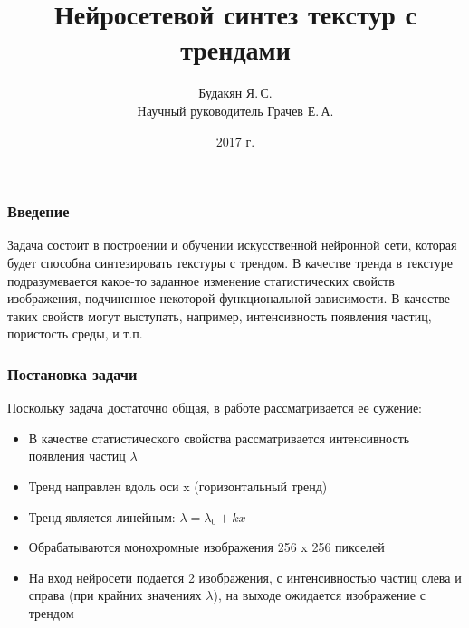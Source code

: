 \documentclass[9pt]{beamer}
\begin{document}
\title{Нейросетевой синтез текстур с трендами}
\author{Будакян Я.\,С. \\ Научный руководитель Грачев Е.\,А.}
\date{2017 г.} 

\maketitle

\begin{frame}\frametitle{Введение}
	Задача состоит в построении и обучении искусственной нейронной сети, которая будет способна синтезировать текстуры с трендом.
	В качестве тренда в текстуре подразумевается какое-то заданное изменение статистических свойств изображения, подчиненное некоторой функциональной зависимости. В качестве таких свойств могут выступать, например, интенсивность появления частиц, пористость среды, и т.п.
\end{frame}

\begin{frame}\frametitle{Постановка задачи} 
	Поскольку задача достаточно общая, в работе рассматривается ее сужение:
	\begin{itemize}
		\item В качестве статистического свойства рассматривается интенсивность появления частиц $\lambda$
		\item Тренд направлен вдоль оси x (горизонтальный тренд)
		\item Тренд является линейным: $ \lambda = \lambda_0 + kx $
		\item Обрабатываются монохромные изображения 256 x 256 пикселей
		\item На вход нейросети подается 2 изображения, с интенсивностью частиц слева и справа (при крайних значениях $\lambda$), на выходе ожидается изображение с трендом
	\end{itemize}
\end{frame}
\end{document}
